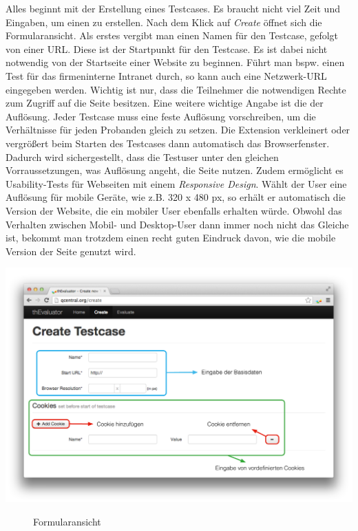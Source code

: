 Alles beginnt mit der Erstellung eines Testcases. Es braucht nicht viel Zeit und Eingaben, um einen zu erstellen. Nach dem Klick auf \textit{Create} öffnet sich die Formularansicht. Als erstes vergibt man einen Namen für den Testcase, gefolgt von einer URL. Diese ist der Startpunkt für den Testcase. Es ist dabei nicht notwendig von der Startseite einer Website zu beginnen. Führt man bspw. einen Test für das firmeninterne Intranet durch, so kann auch eine Netzwerk-URL eingegeben werden. Wichtig ist nur, dass die Teilnehmer die notwendigen Rechte zum Zugriff auf die Seite besitzen. Eine weitere wichtige Angabe ist die der Auflösung. Jeder Testcase muss eine feste Auflösung vorschreiben, um die Verhältnisse für jeden Probanden gleich zu setzen. Die Extension verkleinert oder vergrößert beim Starten des Testcases dann automatisch das Browserfenster. Dadurch wird sichergestellt, dass die Testuser unter den gleichen Vorraussetzungen, was Auflösung angeht, die Seite nutzen. Zudem ermöglicht es Usability-Tests für Webseiten mit einem \textit{Responsive Design}. Wählt der User eine Auflösung für mobile Geräte, wie z.B. 320 x 480 px, so erhält er automatisch die Version der Website, die ein mobiler User ebenfalls erhalten würde. Obwohl das Verhalten zwischen Mobil- und Desktop-User dann immer noch nicht das Gleiche ist, bekommt man trotzdem einen recht guten Eindruck davon, wie die mobile Version der Seite genutzt wird.

\begin{center}
\includegraphics[scale=0.40]{./images/createscreen}
\end{center}
\begin{figure}[htb]
   \centering
   \caption{Formularansicht}
    \label{createview}
\end{figure}

